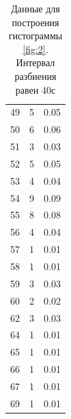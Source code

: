 \documentclass[12pt]{article}
\begin{document}
\begin{table}[H]
\begin{center}
\begin{tabular}{|r|r|l|}
            49                 & 5             & 0.05            \\
            50                 & 6             & 0.06            \\
            51                 & 3             & 0.03            \\
            52                 & 5             & 0.05            \\
            53                 & 4             & 0.04            \\
            54                 & 9             & 0.09            \\
            55                 & 8             & 0.08            \\
            56                 & 4             & 0.04            \\
            57                 & 1             & 0.01            \\
            58                 & 1             & 0.01            \\
            59                 & 3             & 0.03            \\
            60                 & 2             & 0.02            \\
            62                 & 3             & 0.03            \\
            64                 & 1             & 0.01            \\
            65                 & 1             & 0.01            \\
            66                 & 1             & 0.01            \\
            67                 & 1             & 0.01            \\
            69                 & 1             & 0.01            \\
            \hline
        \end{tabular}
    \end{center}
    \caption{Данные для построения гистограммы \ref{fig:2}. Интервал разбиения равен 40с}
    \label{tab:9}
\end{table}
\end{document}
